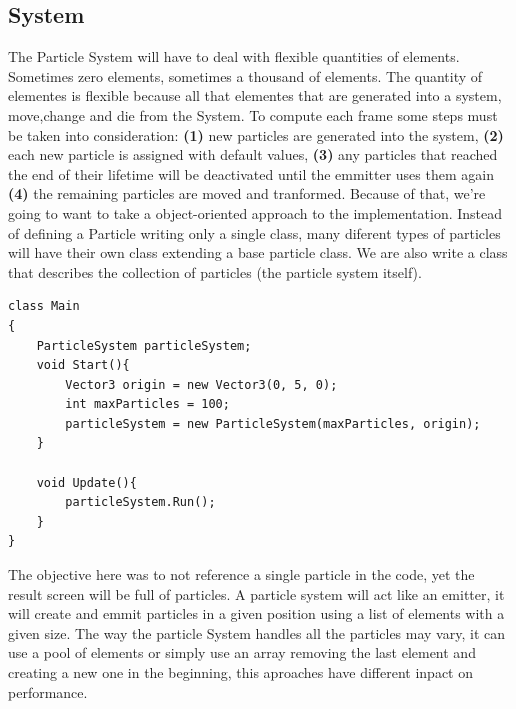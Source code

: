 \subsection{System}
The Particle System will have to deal with flexible quantities of elements. Sometimes zero elements, sometimes a thousand of elements. The quantity of elementes is flexible because all that elementes that are generated into a system, move,change and die from the System. To compute each frame some steps must be taken into consideration: \textbf{(1)} new particles are generated into the system, \textbf{(2)} each new particle is assigned with default values, \textbf{(3)} any particles that reached the end of their lifetime will be deactivated until the emmitter uses them again \textbf{(4)} the remaining particles are moved and tranformed. Because of that, we're going to want to take a object-oriented approach to the implementation. Instead of defining a Particle writing only a single class, many diferent types of particles will have their own class extending a base particle class. We are also write a class that describes the collection of particles (the particle system itself).

\begin{lstlisting}
class Main
{
	ParticleSystem particleSystem;
	void Start(){
		Vector3 origin = new Vector3(0, 5, 0);
		int maxParticles = 100;
		particleSystem = new ParticleSystem(maxParticles, origin);
	}

	void Update(){
		particleSystem.Run();
	}
}
\end{lstlisting}
The objective here was to not reference a single particle in the code, yet the result screen will be full of particles. A particle system will act like an emitter, it will create and emmit particles in a given position using a list of elements with a given size. The way the particle System handles all the particles may vary, it can use a pool of elements or simply use an array removing the last element and creating a new one in the beginning, this aproaches have different inpact on performance.

